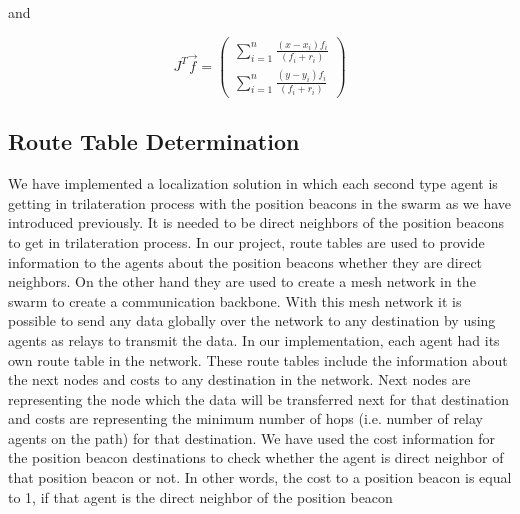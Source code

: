and 

\begin{equation}
J^T\vec{f} = \left(\begin{matrix}
\sum_{i=1}^{n}\frac{(x-x_i)f_i}{(f_i+r_i)} \\
\sum_{i=1}^{n}\frac{(y-y_i)f_i}{(f_i+r_i)}
\end{matrix}\right)
\end{equation}
	
	
\subsection{Route Table Determination}
We have implemented a localization solution in which each second type agent is getting in trilateration process with the position beacons in the swarm as we have introduced previously. It is needed to be direct neighbors of the position beacons to get in trilateration process. In our project, route tables are used to provide information to the agents about the position beacons whether they are direct neighbors. On the other hand they are used to create a mesh network in the swarm to create a communication backbone. With this mesh network it is possible to send any data globally over the network to any destination by using agents as relays to transmit the data. In our implementation, each agent had its own route table in the network. These route tables include the information about the next nodes and costs to any destination in the network. Next nodes are representing the node which the data will be transferred next for that destination and costs are representing the minimum number of hops (i.e. number of relay agents on the path) for that destination. We have used the cost information for the position beacon destinations to check whether the agent is direct neighbor of that position beacon or not. In other words, the cost to a position beacon is equal to 1, if that agent is the direct neighbor of the position beacon


	
